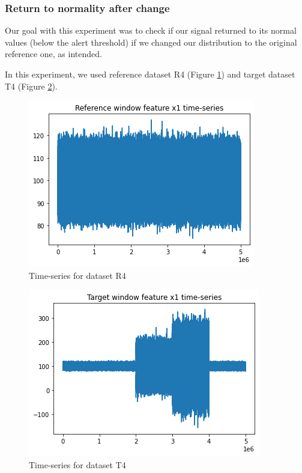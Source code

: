 \subsubsection{Return to normality after change}
Our goal with this experiment was to check if our signal returned to its normal values (below the alert threshold) if we changed our distribution to the original reference one, as intended.

In this experiment, we used reference dataset R4 (Figure \ref{fig:timeseries-r4}) and target dataset T4 (Figure \ref{fig:timeseries-t4}). 
\begin{figure}[!htb]
    \begin{center}
      \includegraphics[scale=0.6]{figures/timeseries-r4.png}
      \caption[]{Time-series for dataset R4}
      \label{fig:timeseries-r4}
    \end{center}
\end{figure}
\begin{figure}[!htb]
    \begin{center}
      \includegraphics[scale=0.6]{figures/timeseries-t4.png}
      \caption[]{Time-series for dataset T4}
      \label{fig:timeseries-t4}
    \end{center}
\end{figure}

